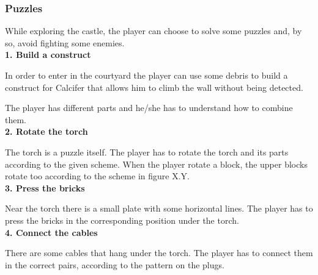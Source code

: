 \subsubsection{Puzzles}
While exploring the castle, the player can choose to solve some puzzles and, by so, avoid fighting some enemies. \\

\textbf{1. Build a construct}

In order to enter in the courtyard the player can use some debris to build a construct for Calcifer that allows him to climb the wall without being detected.

The player has different parts and he/she has to understand how to combine them.\\

\textbf{2. Rotate the torch}

The torch is a puzzle itself. The player has to rotate the torch and its parts according to the given scheme. When the player rotate a block, the upper blocks rotate too according to the scheme in figure X.Y.\\

\textbf{3. Press the bricks}

Near the torch there is a small plate with some horizontal lines. The player has to press the bricks in the corresponding position under the torch.\\

\textbf{4. Connect the cables}

There are some cables that hang under the torch. The player has to connect them in the correct pairs, according to the pattern on the plugs.
